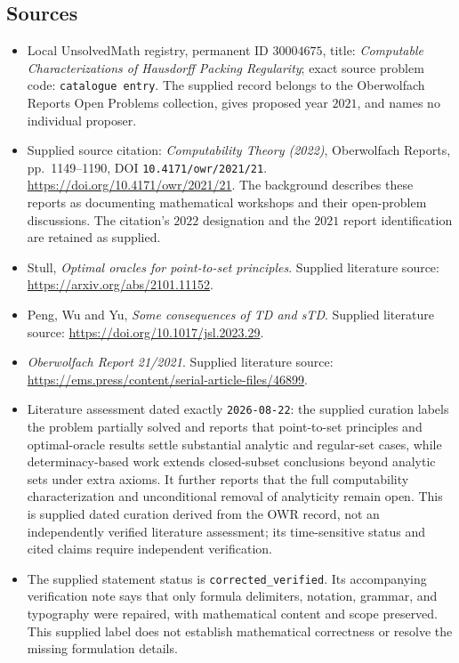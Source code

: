 \documentclass[11pt]{article}
\begin{document}
\subsection{Sources}
\begin{itemize}
\item Local UnsolvedMath registry, permanent ID \(30004675\), title: \emph{Computable Characterizations of Hausdorff Packing Regularity}; exact source problem code: \texttt{catalogue entry}. The supplied record belongs to the Oberwolfach Reports Open Problems collection, gives proposed year \(2021\), and names no individual proposer.
\item Supplied source citation: \emph{Computability Theory (2022)}, Oberwolfach Reports, pp.\ 1149--1190, DOI \texttt{10.4171/owr/2021/21}. \url{https://doi.org/10.4171/owr/2021/21}. The background describes these reports as documenting mathematical workshops and their open-problem discussions. The citation's \(2022\) designation and the \(2021\) report identification are retained as supplied.
\item Stull, \emph{Optimal oracles for point-to-set principles}. Supplied literature source: \url{https://arxiv.org/abs/2101.11152}.
\item Peng, Wu and Yu, \emph{Some consequences of TD and sTD}. Supplied literature source: \url{https://doi.org/10.1017/jsl.2023.29}.
\item \emph{Oberwolfach Report 21/2021}. Supplied literature source: \url{https://ems.press/content/serial-article-files/46899}.
\item Literature assessment dated exactly \texttt{2026-08-22}: the supplied curation labels the problem partially solved and reports that point-to-set principles and optimal-oracle results settle substantial analytic and regular-set cases, while determinacy-based work extends closed-subset conclusions beyond analytic sets under extra axioms. It further reports that the full computability characterization and unconditional removal of analyticity remain open. This is supplied dated curation derived from the OWR record, not an independently verified literature assessment; its time-sensitive status and cited claims require independent verification.
\item The supplied statement status is \texttt{corrected\_verified}. Its accompanying verification note says that only formula delimiters, notation, grammar, and typography were repaired, with mathematical content and scope preserved. This supplied label does not establish mathematical correctness or resolve the missing formulation details.
\end{itemize}
\end{document}
